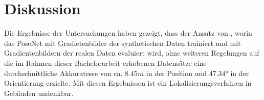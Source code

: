 
\section{Diskussion}
\label{sec:kapitel_5}

Die Ergebnisse der Untersuchungen haben gezeigt, dass der Ansatz von \citet{acharyaBIMPoseNetIndoorCamera2019}, worin das PoseNet mit Gradietenbilder der synthetischen Daten trainiert und mit Gradientenbildern der realen Daten evaluiert wird,  ohne weiteren Regelungen auf die im Rahmen dieser Bachelorarbeit erhobenen Datensätze eine durchschnittliche Akkuratesse von ca. 8.45$m$ in der Position und 47.34° in der Orientierung erzielte. Mit diesen Ergebnissen ist ein Lokalisierungsverfahren in Gebäuden undenkbar.


 

% 




